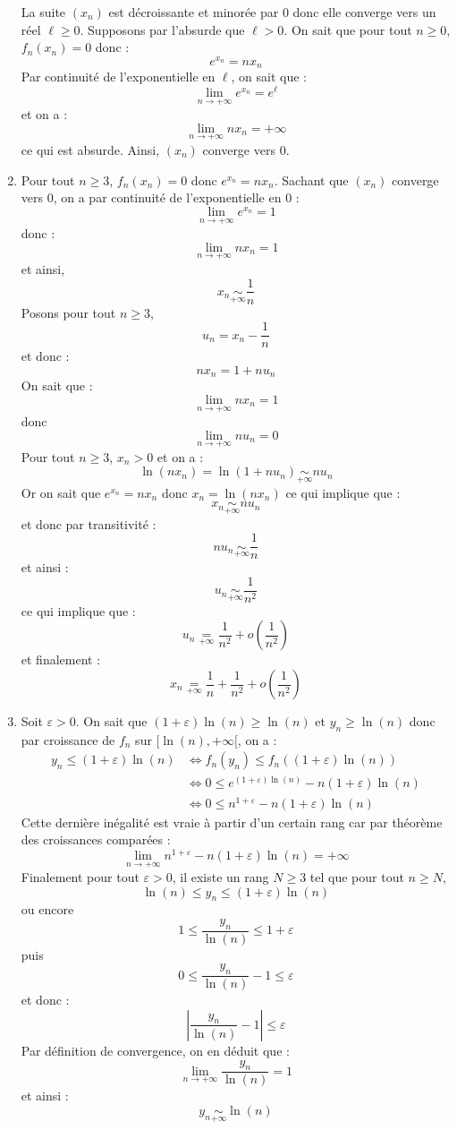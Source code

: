 \documentclass[a4paper,10pt]{report}
\begin{document}
\begin{enumerate}
\noindent La suite $(x_n)$ est décroissante et minorée par $0$ donc elle converge vers un réel $\ell \geq 0$. Supposons par l'absurde que $\ell>0$. On sait que pour tout $n \geq 0$, $f_n(x_n)=0$ donc :
$$e^{x_n} = nx_n$$
Par continuité de l'exponentielle en $\ell$, on sait que :
$$ \lim_{n \rightarrow + \infty} e^{x_n} = e^{\ell}$$
et on a :
$$ \lim_{n \rightarrow + \infty} nx_n = + \infty$$
ce qui est absurde. Ainsi, $(x_n)$ converge vers $0$.
\item Pour tout $n \geq 3$, $f_n(x_n)=0$ donc $e^{x_n} = nx_n$. Sachant que $(x_n)$ converge vers $0$, on a par continuité de l'exponentielle en $0$ :
$$ \lim_{n \rightarrow + \infty} e^{x_n} = 1$$
donc :
$$ \lim_{n \rightarrow + \infty} n x_n = 1$$
et ainsi,
$$x_n \underset{+ \infty}{\sim} \dfrac{1}{n}$$
Posons pour tout $n \geq 3$,
$$ u_n = x_n - \dfrac{1}{n}$$
et donc :
$$ nx_n =1+n u_n $$
On sait que :
$$ \lim_{n \rightarrow + \infty} n x_n = 1$$
donc 
$$ \lim_{n \rightarrow + \infty} n u_n = 0$$
Pour tout $n \geq 3$, $x_n >0$ et on a :
$$ \ln(nx_n) = \ln(1+n u_n) \underset{+ \infty}{\sim} n u_n$$
Or on sait que $e^{x_n}=nx_n$ donc $x_n = \ln(nx_n)$ ce qui implique que :
$$ x_n \underset{+ \infty}{\sim} n u_n $$
et donc par transitivité :
$$ n u_n \underset{+ \infty}{\sim}  \dfrac{1}{n}$$
et ainsi :
$$ u_n \underset{+ \infty}{\sim}  \dfrac{1}{n^2}$$
ce qui implique que :
$$ u_n \underset{+ \infty}{=} \dfrac{1}{n^2} + o \left( \dfrac{1}{n^2} \right)$$
et finalement :
$$ x_n  \underset{+ \infty}{=} \dfrac{1}{n} + \dfrac{1}{n^2} + o \left( \dfrac{1}{n^2} \right)$$
\item Soit $\varepsilon >0$. On sait que $(1+ \varepsilon) \ln(n) \geq \ln(n)$ et $y_n \geq \ln(n)$ donc par croissance de $f_n$ sur $[\ln(n), + \infty[$, on a :
\begin{align*}
y_n \leq (1+ \varepsilon) \ln(n)&  \Longleftrightarrow f_n(y_n) \leq f_n((1+ \varepsilon) \ln(n)) \\
 & \Longleftrightarrow 0 \leq e^{(1+ \varepsilon) \ln(n)} - n (1+ \varepsilon) \ln(n) \\
 & \Longleftrightarrow 0 \leq n^{1+ \varepsilon} - n(1+ \varepsilon) \ln(n) 
 \end{align*}
Cette dernière inégalité est vraie à partir d'un certain rang car par théorème des croissances comparées :
$$ \lim_{n \rightarrow + \infty}  n^{1+ \varepsilon} - n(1+ \varepsilon) \ln(n)  = + \infty$$
Finalement pour tout $\varepsilon>0$, il existe un rang $N \geq 3$ tel que pour tout $n \geq N$,
$$ \ln(n) \leq y_n \leq (1+ \varepsilon) \ln(n)$$
ou encore 
$$ 1 \leq \dfrac{y_n}{\ln(n)} \leq 1+ \varepsilon$$
puis 
$$ 0 \leq \dfrac{y_n}{\ln(n)} - 1 \leq \varepsilon$$
et donc :
$$ \left\vert \dfrac{y_n}{\ln(n)} - 1 \right\vert \leq \varepsilon$$
Par définition de convergence, on en déduit que :
$$ \lim_{n \rightarrow + \infty} \dfrac{y_n}{\ln(n)} = 1$$
et ainsi :
$$ y_n \underset{+ \infty}{\sim} \ln(n)$$

\end{enumerate}
\end{document}
